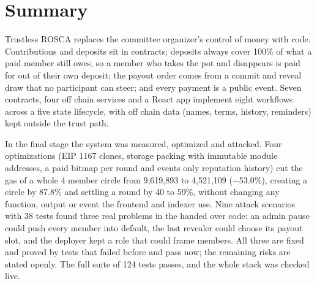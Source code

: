 \section{Summary}
\label{sec:summary}

Trustless ROSCA replaces the committee organizer's control of money with code. Contributions and
deposits sit in contracts; deposits always cover 100\% of what a paid member still owes, so a member who
takes the pot and disappears is paid for out of their own deposit; the payout order comes from a commit
and reveal draw that no participant can steer; and every payment is a public event. Seven contracts,
four off chain services and a React app implement eight workflows across a five state lifecycle, with
off chain data (names, terms, history, reminders) kept outside the trust path.

In the final stage the system was measured, optimized and attacked. Four optimizations (EIP 1167 clones,
storage packing with immutable module addresses, a paid bitmap per round and events only reputation
history) cut the gas of a whole 4 member circle from 9,619,893 to 4,521,109 ($-$53.0\%), creating a
circle by 87.8\% and settling a round by 40 to 59\%, without changing any function, output or event the
frontend and indexer use. Nine attack scenarios with 38 tests found three real problems in the handed
over code: an admin pause could push every member into default, the last revealer could choose its
payout slot, and the deployer kept a role that could frame members. All three are fixed and proved by
tests that failed before and pass now; the remaining risks are stated openly. The full suite of 124 tests
passes, and the whole stack was checked live.
